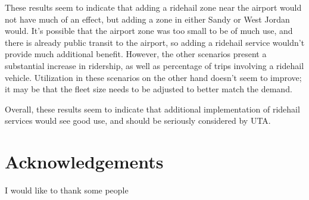\documentclass[3p, authoryear]{elsarticle} %
\begin{document}
These results seem to indicate that adding a ridehail zone near the airport would not have much of an effect, but adding a zone in either Sandy or West Jordan would.
It's possible that the airport zone was too small to be of much use, and there is already public transit to the airport, so adding a ridehail service wouldn't provide much additional benefit.
However, the other scenarios present a substantial increase in ridership, as well as percentage of trips involving a ridehail vehicle.
Utilization in these scenarios on the other hand doesn't seem to improve; it may be that the fleet size needs to be adjusted to better match the demand.

Overall, these results seem to indicate that additional implementation of ridehail services would see good use, and should be seriously considered by UTA.

\hypertarget{acknowledgements}{%
\section*{Acknowledgements}\label{acknowledgements}}

I would like to thank some people


\end{document}
